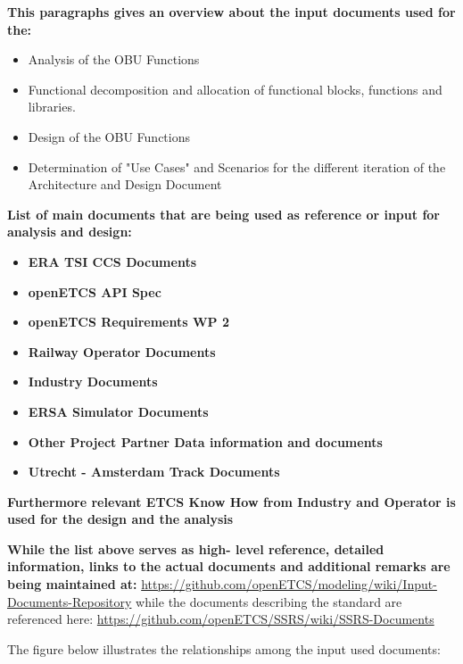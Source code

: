 \textbf{This paragraphs gives an overview about the input documents used for the:}
\begin{itemize}
\item Analysis of the OBU Functions
\item Functional decomposition and allocation of functional blocks, functions and libraries.
\item Design of the OBU Functions
\item Determination of "Use Cases" and Scenarios for the different iteration of the Architecture and Design Document
\end{itemize} 

\textbf{List of main documents that are being used as reference or input for analysis and design:}

\begin{itemize}
\item\textbf{ERA TSI CCS Documents}
\item\textbf{openETCS API Spec}
\item\textbf{openETCS Requirements WP 2}
\item\textbf{Railway Operator Documents}
\item\textbf{Industry Documents}
\item\textbf{ERSA Simulator Documents}
\item\textbf{Other Project Partner Data information and documents}
\item\textbf{Utrecht - Amsterdam Track Documents}
\end{itemize}

\textbf{Furthermore relevant ETCS Know How from Industry and Operator is used for the design and the analysis}

\textbf{While the list above serves as high- level reference, detailed information, links to the actual documents and additional remarks are being maintained at:}
\url{https://github.com/openETCS/modeling/wiki/Input-Documents-Repository}
while the documents describing the standard are referenced here: \url{https://github.com/openETCS/SSRS/wiki/SSRS-Documents}

The figure below illustrates  the relationships among the input used documents: \

